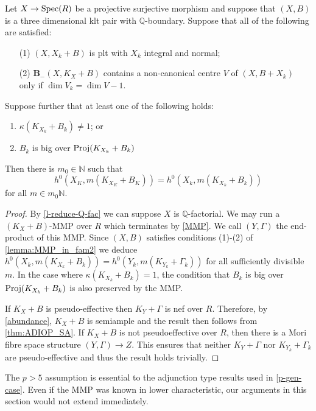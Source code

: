 	\begin{theorem}\label{thm:ADIOP_final2}
		Let $X \to \operatorname{Spec}(R)$ be a projective surjective morphism and suppose that $(X,B)$ is a three dimensional klt pair with $\mathbb{Q}$-boundary.
		Suppose that all of the following are satisfied:
		
		\begin{enumerate}
			\item[(1)] $(X, X_{k}+B)$ is plt with $X_k$ integral and normal;
			\item[(2)]  ${\mathbf{B}_{-}(X, K_{X}+B)}$ contains a non-canonical centre $V$ of $(X,B+X_{k})$ only if $\dim V_{k}=\dim V -1$.
		\end{enumerate}
		
		Suppose further that at least one of the following holds:
		\begin{enumerate}
			\item $\kappa(K_{X_{k}}+B_{k}) \neq 1$; or
			\item $B_{k}$ is big over $\textup{Proj}(K_{X_{k}}+B_{k})$
		\end{enumerate}	
		Then there is $m_{0} \in \mathbb{N}$ such that 
		$$h^{0}(X_{K},m(K_{X_{K}}+B_{K}))=h^{0}(X_{k},m(K_{X_{k}}+B_{k}))$$
		for all $m \in m_{0}\mathbb{N}$.
		
	\end{theorem}
	
	\begin{proof}
		By \autoref{l-reduce-Q-fac} we can suppose $X$ is $\mathbb{Q}$-factorial.
		We may run a $(K_X+B)$-MMP over $R$ which terminates by \autoref{MMP}. 
		We call $(Y,\Gamma)$ the end-product of this MMP. Since $(X,B)$ satisfies conditions (1)-(2) of \autoref{lemma:MMP_in_fam2} we deduce $h^{0}(X_{k},m(K_{X_{k}} + B_{k}))=h^0(Y_k, m(K_{Y_k}+\Gamma_k))$ for all sufficiently divisible $m$. 
		In the case where $\kappa(K_{X_{k}}+B_{k})=1$, the condition that $B_{k}$ is big over $\textup{Proj}(K_{X_{k}}+B_{k})$ is also preserved by the MMP.
		
		If $K_{X}+B$ is pseudo-effective then $K_Y+\Gamma$ is nef over $R$. Therefore, by \autoref{abundance}, $K_{X}+B$ is semiample and the result then follows from \autoref{thm:ADIOP_SA}. 
		If $K_X+B$ is not pseudoeffective over $R$, then there is a Mori fibre space structure $(Y,\Gamma) \to Z$. This ensures that neither $K_{Y}+\Gamma$ nor $K_{Y_{k}}+\Gamma_{k}$ are pseudo-effective and thus the result holds trivially. 
	\end{proof}
	
	
	\begin{remark}	
		The $p>5$ assumption is essential to the adjunction type results used  in \autoref{p-gen-case}. Even if the MMP was known in lower characteristic, our arguments in this section would not extend immediately.
	\end{remark}
%	
%	
%	
%